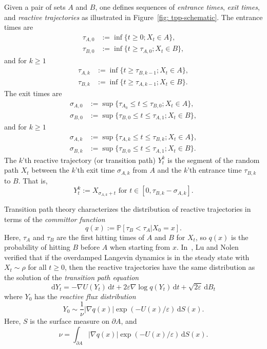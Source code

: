 \documentclass[reqno]{amsart}
\newcommand{\eps}{\varepsilon}
\newcommand{\1}{\mathds{1}}
\renewcommand{\d}{\mathrm{d}}
\newcommand{\grad}{\nabla}
\renewcommand{\P}{\mathds{P}}
\theoremstyle{definition}
\theoremstyle{remark}
\begin{document}
Given a pair of sets $A$ and $B$, one defines sequences of \emph{entrance times}, \emph{exit times}, and \emph{reactive trajectories} as illustrated in Figure~\ref{fig: tpp-schematic}.
The entrance times are
\begin{align*}
  \tau_{A,0} &:= \inf \{ t \geq 0; X_t \in A\}, \\
  \tau_{B,0} &:= \inf \{ t \geq \tau_{A,0}; X_t \in B\}, 
\end{align*}
and for $k \geq 1$
\begin{align*}
  \tau_{A,k} &:= \inf \{ t \geq \tau_{B,k-1}; X_t \in A\}, \\
  \tau_{B,k} &:= \inf \{ t \geq \tau_{A,k-1}; X_t \in B\}.
\end{align*}
The exit times are
\begin{align*}
  \sigma_{A,0} &:= \sup \{ \tau_{A_0} \leq t \leq \tau_{B,0}; X_t \in A\}, \\
  \sigma_{B,0} &:= \sup \{\tau_{B,0} \leq  t \leq \tau_{A,1}; X_t \in B\}, 
\end{align*}
and for $k \geq 1$
\begin{align*}
  \sigma_{A,k} &:= \sup \{ \tau_{A,k} \leq t \leq \tau_{B,k}; X_t \in A\}, \\
  \sigma_{B,k} &:= \sup \{\tau_{B,0} \leq  t \leq \tau_{A,1}; X_t \in B\}.
\end{align*}
The $k$'th reactive trajectory (or transition path) $Y^k_t$ is the segment of the random path $X_t$ between the $k$'th exit time $\sigma_{A,k}$ from $A$ and the $k$'th entrance time $\tau_{B,k}$ to $B$. That is,
\begin{equation*}
Y^k_t := X_{\sigma_{A,k} + t} \text{ for } t \in [0, \tau_{B,k} - \sigma_{A,k}]. 
\end{equation*}

Transition path theory characterizes the distribution of reactive trajectories in terms of the \emph{committor function} 
\begin{equation*}
  q(x) := \P[ \tau_B < \tau_A \vert X_0 = x].
\end{equation*}
Here, $\tau_A$ and $\tau_B$ are the first hitting times of $A$ and $B$ for $X_t$, so $q(x)$ is the probability of hitting $B$ before $A$ when starting from $x$. 
In~\cite{lu_reactive_2015}, Lu and Nolen verified that if the overdamped Langevin dynamics is in the steady state with $X_t \sim \rho$ for all $t \geq 0$, then the reactive trajectories have the same distribution as the solution of the \emph{transition path equation}
\begin{equation}\label{eq: tpp}
    \d Y_t = -\grad U (Y_t) \, \d t + 2 \eps \grad \log q(Y_t) \, \d t + \sqrt{2 \eps} \, \d B_t
\end{equation}
where $Y_0$ has the \emph{reactive flux distribution}
\begin{equation}\label{eq: reactive flux distribution}
  Y_0 \sim \frac{1}{\nu} \lvert  \grad q(x) \rvert \exp(-U(x)/\eps) \, \d S(x). 
\end{equation}
Here, $S$ is the surface measure on $\partial A$, and
\begin{equation*}
  \nu = \int_{\partial A} \lvert  \grad q(x) \rvert \exp(-U(x)/\eps) \, \d S(x).
\end{equation*}
\end{document}
